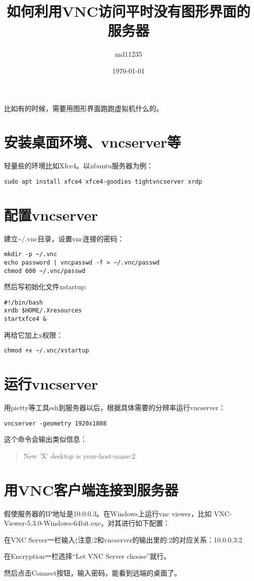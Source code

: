 \documentclass[12pt,a4paper]{article}
\author{md11235}
\date{\today}
\title{如何利用VNC访问平时没有图形界面的服务器}
\begin{document}
\maketitle
\tableofcontents

比如有的时候，需要用图形界面跑跑虚拟机什么的。

\section{安装桌面环境、vncserver等}
\label{sec:orga1a0543}

轻量些的环境比如Xfce4。以ubuntu服务器为例：

\begin{verbatim}
sudo apt install xfce4 xfce4-goodies tightvncserver xrdp
\end{verbatim}

\section{配置vncserver}
\label{sec:orge6fbdd9}

建立\textasciitilde{}/.vnc目录，设置vnc连接的密码：
\begin{verbatim}
mkdir -p ~/.vnc
echo password | vncpasswd -f > ~/.vnc/passwd
chmod 600 ~/.vnc/passwd
\end{verbatim}

然后写初始化文件xstartup:

\begin{verbatim}
#!/bin/bash
xrdb $HOME/.Xresources
startxfce4 &
\end{verbatim}

再给它加上x权限：
\begin{verbatim}
chmod +x ~/.vnc/xstartup
\end{verbatim}

\section{运行vncserver}
\label{sec:orgb79a32f}

用pietty等工具ssh到服务器以后，根据具体需要的分辨率运行vncserver：

\begin{verbatim}
vncserver -geometry 1920x1808
\end{verbatim}

这个命令会输出类似信息：

\begin{quote}
New 'X' desktop is your-host-name:2
\end{quote}

\section{用VNC客户端连接到服务器}
\label{sec:org0d9eb8b}

假使服务器的IP地址是10.0.0.3。在Windows上运行vnc viewer，比如
VNC-Viewer-5.3.0-Windows-64bit.exe，对其进行如下配置：

在VNC Server一栏输入(注意:2和vncserver的输出里的:2的对应关系：10.0.0.3:2

在Encryption一栏选择“Let VNC Server choose”就行。

然后点击Connect按钮，输入密码，能看到远端的桌面了。
\end{document}
